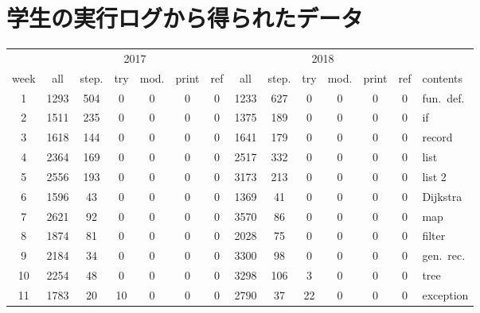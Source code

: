 \appendix
\chapter{学生の実行ログから得られたデータ}

\begin{table}[h]
\begin{center}
  \begin{tabular}{|c||c|c|c|c|c|c||c|c|c|c|c|c||l|}
    \hline
    & \multicolumn{6}{|c||}{2017} & \multicolumn{6}{|c||}{2018} & \\ \cline{2-13}
    \hspace{-1mm}week\hspace{-1mm} & all & step. & try & \hspace{-1mm}mod.\hspace{-1mm} & \hspace{-1mm}print\hspace{-1mm} & ref
    & all & step. & try & \hspace{-1mm}mod.\hspace{-1mm} & \hspace{-1mm}print\hspace{-1mm} & ref & contents\\ \hline
    1 & 1293 & 504 & 0 & 0 & 0 & 0 & 1233 & 627 & 0 & 0 & 0 & 0 & fun.\ def.\\ \hline
    2 & 1511 & 235 & 0 & 0 & 0 & 0 & 1375 & 189 & 0 & 0 & 0 & 0 & if\\ \hline
    3 & 1618 & 144 & 0 & 0 & 0 & 0 & 1641 & 179 & 0 & 0 & 0 & 0 & record\\ \hline
    4 & 2364 & 169 & 0 & 0 & 0 & 0 & 2517 & 332 & 0 & 0 & 0 & 0 & list\\ \hline
    5 & 2556 & 193 & 0 & 0 & 0 & 0 & 3173 & 213 & 0 & 0 & 0 & 0 & list 2\\ \hline
    6 & 1596 & 43 & 0 & 0 & 0 & 0 & 1369 & 41 & 0 & 0 & 0 & 0 & Dijkstra\\ \hline
    7 & 2621 & 92 & 0 & 0 & 0 & 0 & 3570 & 86 & 0 & 0 & 0 & 0 & map\\ \hline
    8 & 1874 & 81 & 0 & 0 & 0 & 0 & 2028 & 75 & 0 & 0 & 0 & 0 & filter\\ \hline
    9 & 2184 & 34 & 0 & 0 & 0 & 0 & 3300 & 98 & 0 & 0 & 0 & 0 & gen.\ rec.\\ \hline
    10 & 2254 & 48 & 0 & 0 & 0 & 0 & 3298 & 106 & 3 & 0 & 0 & 0 & tree\\ \hline
    11 & 1783 & 20 & 10 & 0 & 0 & 0 & 2790 & 37 & 22 & 0 & 0 & 0 & exception\\ \hline

\end{tabular}
\end{center}
\end{table}

